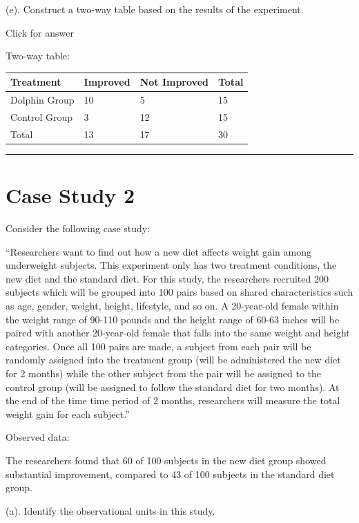 \documentclass[
]{book}
\begin{document}
(e). Construct a two-way table based on the results of the experiment.

Click for answer

Two-way table:

\begin{longtable}[]{@{}llll@{}}
\toprule()
Treatment & Improved & Not Improved & Total \\
\midrule()
\endhead
Dolphin Group & 10 & 5 & 15 \\
Control Group & 3 & 12 & 15 \\
Total & 13 & 17 & 30 \\
\bottomrule()
\end{longtable}

\begin{center}\rule{0.5\linewidth}{0.5pt}\end{center}

\hypertarget{case-study-2}{%
\section{Case Study 2}\label{case-study-2}}

Consider the following case study:

``Researchers want to find out how a new diet affects weight gain among underweight subjects. This experiment only has two treatment conditions, the new diet and the standard diet. For this study, the researchers recruited 200 subjects which will be grouped into 100 pairs based on shared characteristics such as age, gender, weight, height, lifestyle, and so on. A 20-year-old female within the weight range of 90-110 pounds and the height range of 60-63 inches will be paired with another 20-year-old female that falls into the same weight and height categories. Once all 100 pairs are made, a subject from each pair will be randomly assigned into the treatment group (will be administered the new diet for 2 months) while the other subject from the pair will be assigned to the control group (will be assigned to follow the standard diet for two months). At the end of the time time period of 2 months, researchers will measure the total weight gain for each subject.''

Observed data:

The researchers found that 60 of 100 subjects in the new diet group showed substantial improvement, compared to 43 of 100 subjects in the standard diet group.

(a). Identify the observational units in this study.
\end{document}
